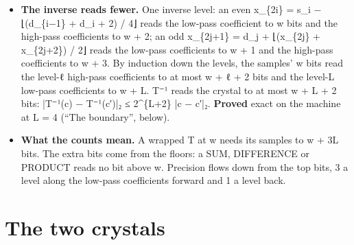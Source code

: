 \begin{itemize}
\begin{itemize}
\item Upper bound: a level reads the low-pass coefficients below it to 3 bits more, by the table.
\item Exact on the outermost sample of an interior cone. Of the level-(ℓ − 1) low-pass coefficients the cone reads, that sample reaches only the outermost, as its outer even. Adding 2\textasciicircum{}\{m+2\} to an outer even moves the low-pass coefficient above by exactly −2\textasciicircum{}\{m−1\} for m ≥ 1. Adding 2\textasciicircum{}\{w+3L−1\} to the sample moves the outermost level-1 low-pass coefficient of the cone by 2\textasciicircum{}\{w+3L−4\} in magnitude, the level-2 low-pass coefficient by 2\textasciicircum{}\{w+3L−7\}, and the level-L low-pass coefficient by 2\textasciicircum{}\{w−1\}.
\item As a 2-adic modulus: |T(x) − T(y)|₂ ≤ 2\textasciicircum{}\{3L\} |x − y|₂ along one line.
\item \textbf{Proved} on the machine, the bound and its exactness, per band: 3ℓ at the level-ℓ low-pass coefficients and 3ℓ − 2 at the level-ℓ high-pass coefficients (“The boundary”, below).
\end{itemize}
\item \textbf{The inverse reads fewer.} One inverse level: an even x\_\allowbreak{}\{2i\} = s\_\allowbreak{}i − ⌊(d\_\allowbreak{}\{i−1\} + d\_\allowbreak{}i + 2) / 4⌋ reads the low-pass coefficient to w bits and the high-pass coefficients to w + 2; an odd x\_\allowbreak{}\{2j+1\} = d\_\allowbreak{}j + ⌊(x\_\allowbreak{}\{2j\} + x\_\allowbreak{}\{2j+2\}) / 2⌋ reads the low-pass coefficients to w + 1 and the high-pass coefficients to w + 3. By induction down the levels, the samples' w bits read the level-ℓ high-pass coefficients to at most w + ℓ + 2 bits and the level-L low-pass coefficients to w + L. T⁻¹ reads the crystal to at most w + L + 2 bits: |T⁻¹(c) − T⁻¹(c′)|₂ ≤ 2\textasciicircum{}\{L+2\} |c − c′|₂. \textbf{Proved} exact on the machine at L = 4 (“The boundary”, below).
\item \textbf{What the counts mean.} A wrapped T at w needs its samples to w + 3L bits. The extra bits come from the floors: a SUM, DIFFERENCE or PRODUCT reads no bit above w. Precision flows down from the top bits, 3 a level along the low-pass coefficients forward and 1 a level back.
\end{itemize}

\section{\texorpdfstring{The two crystals}{The two crystals}}

